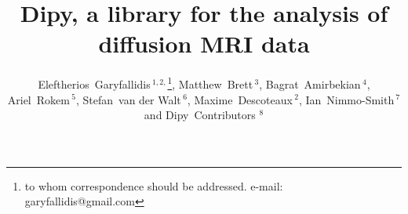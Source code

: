 \documentclass{bioinfo}
\begin{document}

\title[DIPY]{Dipy, a library for the analysis of diffusion MRI data}

\author[Garyfallidis, Brett, Amirbekian, Rokem, van der Walt, Descoteaux,
  Nimmo-Smith]{Eleftherios~Garyfallidis\,$^{1,2,}$\footnote{to whom correspondence should be addressed. e-mail:
    garyfallidis@gmail.com}, Matthew~Brett\,$^{3}$,
  Bagrat~Amirbekian\,$^{4}$, Ariel~Rokem\,$^{5}$, Stefan~van der Walt\,$^{6}$,
  Maxime~Descoteaux\,$^{2}$, Ian~Nimmo-Smith\,$^{7}$ and Dipy~Contributors
  $^{8}$}

\address{\,$^{1}$University of Sherbrooke, Sherbrooke, CA\\
  \,$^{2}$University of Cambridge, Cambridge, UK\\
  \,$^{3}$University of California, Henry H. Wheeler, Jr. Brain Imaging Center, Berkeley, CA.\\
  \,$^{4}$University of California, San Francisco, CA, USA\\
  \,$^{5}$Stanford University, Stanford, CA, USA\\
  \,$^{6}$Stellenbosch University, Stellenbosch, South Africa\\
  \,$^{7}$MRC Cognition and Brain Sciences Unit, Cambridge, UK\\
  \,$^{8}$\texttt{http://dipy.org/developers.html}
  }
\history{}

\editor{}

\maketitle
\end{document}
